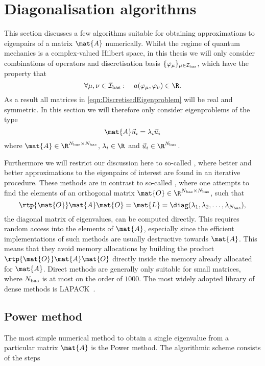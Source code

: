 \section{Diagonalisation algorithms}
\label{sec:DiagAlgos}

This section discusses a few algorithms suitable for obtaining
approximations to eigenpairs of a matrix $\mat{A}$ numerically.
Whilst the regime of quantum mechanics is a complex-valued Hilbert space,
in this thesis
we will only consider combinations of operators and discretisation basis
$\{\varphi_\mu\}_{\mu \in \mathcal{I}_\text{bas}}$,
which have the property that
\[ \forall \mu, \nu \in \Ibas: \quad a(\varphi_\mu, \varphi_\nu) \in \R. \]
As a result all matrices in \eqref{eqn:DiscretisedEigenproblem} will be real and symmetric.
In this section we will therefore only consider eigenproblems of the type
\[ \mat{A} \vec{u}_i = \lambda_i \vec{u}_i \]
where $\mat{A} \in \R^{\Nbas \times \Nbas}$,
$\lambda_i \in \R$ and $\vec{u}_i \in \R^{\Nbas}$.

Furthermore we will restrict our discussion here to so-called
,
where better and better approximations to the eigenpairs of interest
are found in an iterative procedure.
These methods are in contrast to so-called ,
where one attempts to find the elements of an orthogonal matrix $\mat{O} \in \R^{\Nbas\times\Nbas}$,
such that
\[ \rtp{\mat{O}} \mat{A} \mat{O} = \mat{L} = \diag(\lambda_1, \lambda_2, \ldots, \lambda_{\Nbas}), \]
the diagonal matrix of eigenvalues, can be computed directly.
This requires random access into the elements of $\mat{A}$,
especially since the efficient implementations of such methods
are usually destructive towards $\mat{A}$.
This means that they avoid memory allocations by building the product
$\rtp{\mat{O}} \mat{A} \mat{O}$ directly inside the memory already allocated for $\mat{A}$.
Direct methods are generally only suitable for small matrices,
where $N_\text{bas}$ is at most on the order of $1000$.
The most widely adopted library of dense methods is LAPACK~\cite{LAPACK}.

\subsection{Power method}
The most simple numerical method to obtain
a single eigenvalue from a particular matrix $\mat{A}$
is the Power method.
The algorithmic scheme consists of the steps


